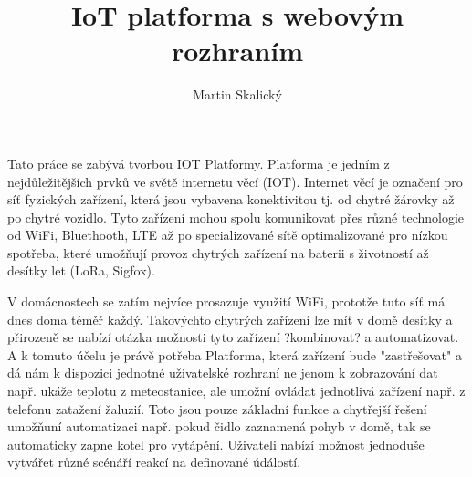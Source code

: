 \documentclass[thesis=B,czech]{FITthesis}[2019/12/23]
\title{IoT platforma s webovým rozhraním}
\author{Martin Skalický} %
\begin{document}

\begin{introduction}
    Tato práce se zabývá tvorbou IOT Platformy. Platforma je jedním z nejdůležitějších prvků ve světě internetu věcí (IOT). Internet věcí je označení pro síť fyzických zařízení, která jsou vybavena konektivitou tj. od chytré žárovky až po chytré vozidlo. Tyto zařízení mohou spolu komunikovat přes různé technologie od WiFi, Bluethooth, LTE až po specializované sítě optimalizované pro nízkou spotřeba, které umožňují provoz chytrých zařízení na baterii s životností až desítky let (LoRa, Sigfox).
    
    V domácnostech se zatím nejvíce prosazuje využití WiFi, prototže tuto síť má dnes doma téměř každý. Takovýchto chytrých zařízení lze mít v domě desítky a přirozeně se nabízí otázka možnosti tyto zařízení ?kombinovat? a automatizovat. A k tomuto účelu je právě potřeba Platforma, která zařízení bude "zastřešovat" a dá nám k dispozici jednotné uživatelské rozhraní ne jenom k zobrazování dat např. ukáže teplotu z meteostanice, ale umožní ovládat jednotlivá zařízení např. z telefonu zatažení žaluzií. Toto jsou pouze základní funkce a chytřejší řešení umožňuní automatizaci např. pokud čidlo zaznamená pohyb v domě, tak se automaticky zapne kotel pro vytápění. Uživateli nabízí možnost jednoduše vytvářet různé scénáří reakcí na definované údálostí.
    


\end{introduction}
\end{document}
